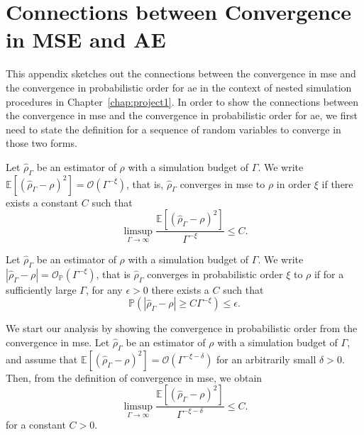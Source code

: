 \chapter{Connections between Convergence in MSE and AE} \label{chap:appendix1}

This appendix sketches out the connections between the convergence in \gls{mse} and the convergence in probabilistic order for \gls{ae} in the context of nested simulation procedures in Chapter~\ref{chap:project1}.
In order to show the connections between the convergence in \gls{mse} and the convergence in probabilistic order for \gls{ae}, we first need to state the definition for a sequence of random variables to converge in those two forms.

\begin{definitionA1*}
    Let $\hat{\rho}_{\Gamma}$ be an estimator of $\rho$ with a simulation budget of $\Gamma$. 
    We write $\mathbb{E} \left[ \left(\hat{\rho}_{\Gamma} - \rho\right)^2 \right] = \mathcal{O} \left( \Gamma^{-\xi} \right)$, that is, $\hat{\rho}_{\Gamma}$ converges in \gls{mse} to $\rho$ in order $\xi$ if there exists a constant $C$ such that
    $$
        \limsup_{\Gamma \to \infty} \frac{\mathbb{E} \left[\left(\hat{\rho}_{\Gamma} - \rho\right)^2 \right]}{\Gamma^{-\xi}} \leq C.
    $$
\end{definitionA1*}

\begin{definitionA2*}
    Let $\hat{\rho}_{\Gamma}$ be an estimator of $\rho$ with a simulation budget of $\Gamma$. 
    We write $|\hat{\rho}_{\Gamma} - \rho| = \mathcal{O}_{\mathbb{P}}(\Gamma^{-\xi})$, that is $\hat{\rho}_{\Gamma}$ converges in probabilistic order $\xi$ to $\rho$ if for a sufficiently large $\Gamma$, for any $\epsilon > 0$ there exists a $C$ such that
    $$
         \mathbb{P} \left( \left| \hat{\rho}_{\Gamma} - \rho \right| \geq C \Gamma^{-\xi} \right) \leq \epsilon.
    $$
\end{definitionA2*}

We start our analysis by showing the convergence in probabilistic order from the convergence in \gls{mse}.
Let $\hat{\rho}_{\Gamma}$ be an estimator of $\rho$ with a simulation budget of $\Gamma$, and assume that $\mathbb{E} \left[ \left(\hat{\rho}_{\Gamma} - \rho\right)^2 \right] = \mathcal{O} \left( \Gamma^{-\xi-\delta} \right)$ for an arbitrarily small $\delta > 0$.
Then, from the definition of convergence in \gls{mse}, we obtain
$$
    \limsup_{\Gamma \to \infty} \frac{\mathbb{E} \left[ \left(\hat{\rho}_{\Gamma} - \rho\right)^2 \right]}{\Gamma^{-\xi-\delta}} \leq C.
$$
for a constant $C > 0$.

